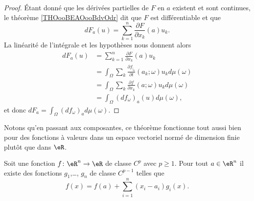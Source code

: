 \begin{proof}
	Étant donné que les dérivées partielles de \( F\) en \( a\) existent et sont continues, le théorème \ref{THOooBEAOooBdvOdr} dit que \( F\) est différentiable et que
	\begin{equation}
		dF_a(u)=\sum_{k=1}^n\frac{ \partial F }{ \partial x_k }(a)u_k.
	\end{equation}
	La linéarité de l'intégrale et les hypothèses nous donnent alors
	\begin{subequations}
		\begin{align}
			dF_a(u) & =\sum_{k=1}^n\frac{ \partial F }{ \partial x_k }(a)u_k                                 \\
			        & =\int_{\Omega}\sum_k\frac{ \partial f_{|_k} }{ \partial t }(a_k;\omega)u_kd\mu(\omega) \\
			        & =\int_{\Omega}\sum_k\frac{ \partial f }{ \partial x_k }(a;\omega)u_kd\mu(\omega)       \\
			        & =\int_{\Omega}(df_{\omega})_a(u)d\mu(\omega),
		\end{align}
	\end{subequations}
	et donc \( dF_a=\int_{\Omega}(df_{\omega})_ad\mu(\omega)\).
\end{proof}
Notons qu'en passant aux composantes, ce théorème fonctionne tout aussi bien pour des fonctions à valeurs dans un espace vectoriel normé de dimension finie plutôt que dans \( \eR\).

\begin{lemma}   \label{LemWNBooGPlIwT}
	Soit une fonction \( f\colon \eR^n\to \eR\) de classe \( C^p\) avec \( p\geq 1\). Pour tout \( a\in \eR^n\) il existe des fonctions \( g_1\),\ldots, \( g_n\) de classe \( C^{p-1}\) telles que
	\begin{equation}
		f(x)=f(a)+\sum_{i=1}^n(x_i-a_i)g_i(x).
	\end{equation}
\end{lemma}

